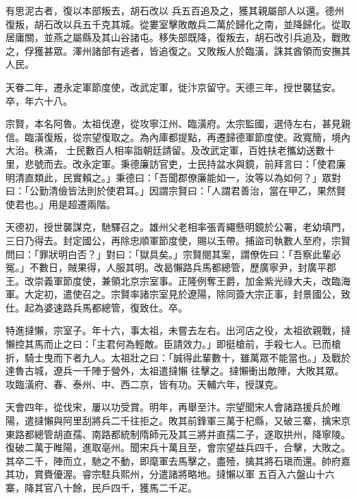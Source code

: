 \begin{pinyinscope}
 有思泥古者，復以本部叛去，胡石改以
 兵五百追及之，獲其親屬部人以還。德州復叛，胡石改以兵五千克其城。從婁室擊敗敵兵二萬於歸化之南，並降歸化。從取居庸關，並燕之屬縣及其山谷諸屯。移失部既降，復叛去，胡石改引兵追及，戰敗之，俘獲甚眾。澤州諸部有逃者，皆追復之。又敗叛人於臨潢，誅其酋領而安撫其人民。



 天眷二年，遷永定軍節度使，改武定軍，徙汴京留守。天德三年，授世襲猛安。卒，年六十八。



 宗賢，本名阿魯。太祖伐遼，從攻寧江州、臨潢府。太宗監國，選侍左右，甚見親信。臨潢復叛，從宗望復取之。為內庫都提點，再遷歸德軍節度使。政寬簡，境內大治。秩滿，
 士民數百人相率詣朝廷請留。及改武定軍，百姓扶老攜幼送數十里，悲號而去。改永定軍。秉德廉訪官吏，士民持盆水與鏡，前拜言曰：「使君廉明清直類此，民實賴之。」秉德曰：「吾聞郡僚廉能如一，汝等以為如何？」眾對曰：「公勤清儉皆法則於使君耳。」因謂宗賢曰：「人謂君善治，當在甲乙，果然賢使君也。」用是超遷兩階。



 天德初，授世襲謀克，馳驛召之。雄州父老相率張青繩懸明鏡於公署，老幼填門，三日乃得去。封定國公，再除忠順軍節度使，賜以玉帶。捕盜司執數人至府，宗賢問曰：「罪狀明白否？」對曰：「獄具矣。」宗賢閱其案，謂僚佐曰：「吾察此輩必
 冤。」不數日，賊果得，人服其明。改曷懶路兵馬都總管，歷廣寧尹，封廣平郡王。改崇義軍節度使，兼領北京宗室事。正隆例奪王爵，加金紫光祿大夫，改臨海軍。大定初，遣使召之。宗賢率諸宗室見於遼陽，除同簽大宗正事，封景國公，致仕。起為婆速路兵馬都總管，復致仕。卒。



 特進撻懶，宗室子。年十六，事太祖，未嘗去左右。出河店之役，太祖欲親戰，撻懶控其馬而止之曰：「主君何為輕敵。臣請效力。」即挺槍前，手殺七人。已而槍折，騎士曳而下者九人。太祖壯之曰：「誠得此輩數十，雖萬眾不能當也。」及戰於達魯古城，遼兵一千陣于營外，太祖遣撻懶
 往擊之。撻懶衝出敵陣，大敗其眾。攻臨潢府、春、泰州、中、西二京，皆有功。天輔六年，授謀克。



 天會四年，從伐宋，屢以功受賞。明年，再舉至汴。宗望聞宋人會諸路援兵於睢陽，遣撻懶與阿里刮將兵二千往拒之。敗其前鋒軍三萬于杞縣，又破三寨，擒宋京東路都總管胡直孺、南路都統制隋師元及其三將并直孺二子，遂取拱州，降寧陵。復破二萬于睢陽，進取亳州。聞宋兵十萬且至，會宗望益兵四千，合擊，大敗之。其卒二千，陣而立，馳之不動，即麾軍去馬擊之，盡殪，擒其將石瑱而還。帥府嘉其功，賞賚優渥。睿宗駐兵熙州，分遣諸將略地。撻懶以軍
 五百入六盤山十六寨，降其官八十餘，民戶四千，獲馬二千疋。




\end{pinyinscope}
